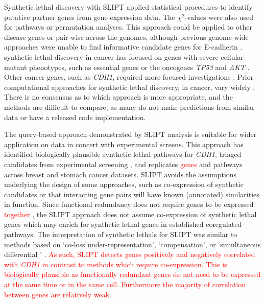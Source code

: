 Synthetic lethal discovery  with \gls{SLIPT} applied statistical procedures to identify putative partner genes from \gls{gene expression} data. The $\chi^2$-values were also used for \glspl{pathway} or permutation analyses. This approach could be applied to other disease genes or pair-wise across the \glspl{genome}, although previous \gls{genome}-wide approaches were unable to find informative candidate genes for \gls{E-cadherin} \citep{Lu2015}. \Gls{synthetic lethal} discovery in cancer has focused on genes with severe cellular \gls{mutant} phenotypes, such as \gls{essential} genes or the \glspl{oncogene} \textit{TP53} and \textit{AKT} \citep{Tiong2014, Lu2015, Wang2013}. Other cancer genes, such as \textit{CDH1}, required more focused investigations \citep{Srihari2015, Telford2015}. Prior computational approaches for \gls{synthetic lethal} discovery, in cancer, vary widely \citep{Tiong2014, Jerby2014, Lu2015, Wappett2016}. There is no consensus as to which approach is more appropriate, and the methods are difficult to compare, as many do not make predictions from similar data or have a released code implementation.

The query-based approach demonstrated by \gls{SLIPT} analysis is suitable for wider application on  data in concert with experimental screens. This approach has identified biologically plausible \gls{synthetic lethal} \glspl{pathway} for \textit{CDH1}, triaged candidates from experimental screening \citep{Telford2015}, and replicates \textcolor{red}{genes} and \glspl{pathway} across breast and stomach cancer datasets. \gls{SLIPT} avoids the assumptions underlying the design of some approaches, such as co-expression of synthetic candidates or that interacting gene pairs will have known (annotated) similarities in function. 
%
Since \gls{functional redundancy} does not require genes to be expressed \textcolor{red}{together} \citep{Lu2015}, the \gls{SLIPT} approach does not assume co-expression of \gls{synthetic lethal} genes which may enrich for \gls{synthetic lethal} genes in established coregulated \glspl{pathway}. The interpretation of \glspl{synthetic lethal} for \gls{SLIPT} was similar to methods based on `co-loss under-represent\-at\-ion', `compensation', or `simultaneous differential ' \citep{Tiong2014, Lu2015, Wang2013}. \textcolor{red}{As such, SLIPT detects genes positively and negatively correlated with \textit{CDH1} in contrast to methods which require co-expression. This is biologically plausible as functionally redundant genes do not need to be expressed at the same time or in the same cell. Furthermore the majority of correlation between genes are relatively weak.}

